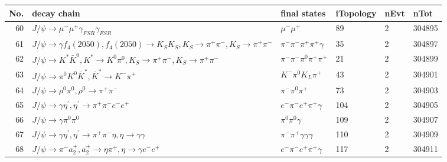 \begin{table}[htbp] 
\begin{center}
\begin{small}
\begin{tabular}{rlllll}\hline\hline
 No. & decay chain & final states &  iTopology & nEvt & nTot \\\hline
 60&$J/\psi       \rightarrow \mu^{-}      \mu^{+}      \gamma_{FSR} \gamma_{FSR} $&$\mu^{-}      \mu^{+}      $&   89&    2&304895\\
 61&$J/\psi       \rightarrow \gamma       f_{4}(2050)    , f_{4}(2050)     \rightarrow K_{S}          K_{S}          , K_{S}           \rightarrow \pi^{+}        \pi^{-}        , K_{S}           \rightarrow \pi^{+}        \pi^{-}        $&$\pi^{-}        \pi^{-}        \pi^{+}        \pi^{+}        \gamma       $&   35&    2&304897\\
 62&$J/\psi       \rightarrow K^{*}          \bar{K}^{0}   , K^{*}           \rightarrow K^{0}          \pi^{0}        , K_{S}           \rightarrow \pi^{+}        \pi^{-}        , K_{S}           \rightarrow \pi^{+}        \pi^{-}        $&$\pi^{-}        \pi^{-}        \pi^{0}        \pi^{+}        \pi^{+}        $&   21&    2&304899\\
 63&$J/\psi       \rightarrow \pi^{0}        K^{0}          \bar{K}^{*}   , \bar{K}^{*}    \rightarrow K^{-}          \pi^{+}        $&$K^{-}          \pi^{0}        K_{L}          \pi^{+}        $&   43&    2&304901\\
 64&$J/\psi       \rightarrow \rho^{0}      \pi^{0}        , \rho^{0}       \rightarrow \pi^{+}        \pi^{-}        $&$\pi^{-}        \pi^{0}        \pi^{+}        $&   73&    2&304903\\
 65&$J/\psi       \rightarrow \gamma       \eta^{\prime} , \eta^{\prime}  \rightarrow \pi^{+}        \pi^{-}        e^{-}        e^{+}        $&$e^{-}        \pi^{-}        e^{+}        \pi^{+}        \gamma       $&  104&    2&304905\\
 66&$J/\psi       \rightarrow \gamma       \pi^{0}        \pi^{0}        $&$\pi^{0}        \pi^{0}        \gamma       $&  109&    2&304907\\
 67&$J/\psi       \rightarrow \gamma       \eta^{\prime} , \eta^{\prime}  \rightarrow \pi^{+}        \pi^{-}        \eta          , \eta           \rightarrow \gamma       \gamma       $&$\pi^{-}        \pi^{+}        \gamma       \gamma       \gamma       $&  110&    2&304909\\
 68&$J/\psi       \rightarrow \pi^{-}        a_{2}^{+}      , a_{2}^{+}       \rightarrow \eta          \pi^{+}        , \eta           \rightarrow \gamma       e^{-}        e^{+}        $&$e^{-}        \pi^{-}        e^{+}        \pi^{+}        \gamma       $&  117&    2&304911\\

\end{tabular}
\end{small}
\end{center}
\end{table}
